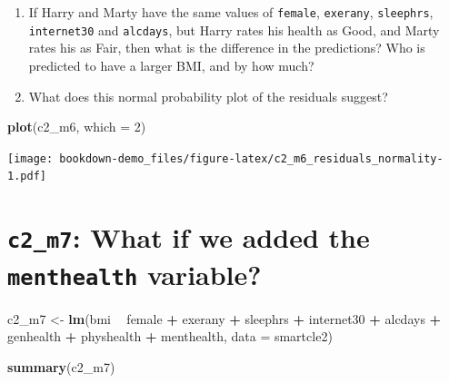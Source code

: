 \documentclass[]{book}
\newenvironment{Shaded}{\begin{snugshade}}{\end{snugshade}}
\newcommand{\KeywordTok}[1]{\textcolor[rgb]{0.13,0.29,0.53}{\textbf{#1}}}
\newcommand{\DataTypeTok}[1]{\textcolor[rgb]{0.13,0.29,0.53}{#1}}
\newcommand{\DecValTok}[1]{\textcolor[rgb]{0.00,0.00,0.81}{#1}}
\newcommand{\StringTok}[1]{\textcolor[rgb]{0.31,0.60,0.02}{#1}}
\newcommand{\OperatorTok}[1]{\textcolor[rgb]{0.81,0.36,0.00}{\textbf{#1}}}
\newcommand{\NormalTok}[1]{#1}
\theoremstyle{definition}
\theoremstyle{definition}
\theoremstyle{definition}
\theoremstyle{remark}
\begin{document}
\begin{enumerate}
\def\labelenumi{\arabic{enumi}.}
\item
  If Harry and Marty have the same values of \texttt{female},
  \texttt{exerany}, \texttt{sleephrs}, \texttt{internet30} and
  \texttt{alcdays}, but Harry rates his health as Good, and Marty rates
  his as Fair, then what is the difference in the predictions? Who is
  predicted to have a larger BMI, and by how much?
\item
  What does this normal probability plot of the residuals suggest?
\end{enumerate}

\begin{Shaded}
\begin{Highlighting}[]
\KeywordTok{plot}\NormalTok{(c2_m6, }\DataTypeTok{which =} \DecValTok{2}\NormalTok{)}
\end{Highlighting}
\end{Shaded}

\texttt{[image: bookdown-demo\_files/figure-latex/c2\_m6\_residuals\_normality-1.pdf]}

\section{\texorpdfstring{\texttt{c2\_m7}: What if we added the
\texttt{menthealth}
variable?}{c2\_m7: What if we added the menthealth variable?}}\label{c2_m7-what-if-we-added-the-menthealth-variable}

\begin{Shaded}
\begin{Highlighting}[]
\NormalTok{c2_m7 <-}\StringTok{ }\KeywordTok{lm}\NormalTok{(bmi }\OperatorTok{~}\StringTok{ }\NormalTok{female }\OperatorTok{+}\StringTok{ }\NormalTok{exerany }\OperatorTok{+}\StringTok{ }\NormalTok{sleephrs }\OperatorTok{+}\StringTok{ }\NormalTok{internet30 }\OperatorTok{+}\StringTok{ }\NormalTok{alcdays }\OperatorTok{+}\StringTok{ }
\StringTok{                }\NormalTok{genhealth }\OperatorTok{+}\StringTok{ }\NormalTok{physhealth }\OperatorTok{+}\StringTok{ }\NormalTok{menthealth,}
         \DataTypeTok{data =}\NormalTok{ smartcle2)}

\KeywordTok{summary}\NormalTok{(c2_m7)}
\end{Highlighting}
\end{Shaded}
\end{document}
